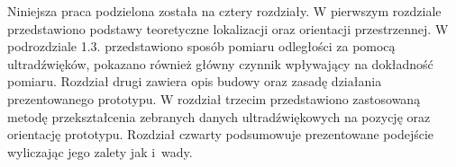 Niniejsza praca podzielona została na cztery rozdziały. W pierwszym rozdziale przedstawiono podstawy teoretyczne lokalizacji oraz orientacji 
przestrzennej. W podrozdziale 1.3. przedstawiono sposób pomiaru odległości za pomocą ultradźwięków, pokazano 
również główny czynnik wpływający na dokładność pomiaru.
Rozdział drugi zawiera opis budowy oraz zasadę działania prezentowanego prototypu. W rozdział trzecim
przedstawiono zastosowaną metodę przekształcenia zebranych danych ultradźwiękowych na pozycję oraz orientację prototypu.
Rozdział czwarty podsumowuje prezentowane podejście wyliczając jego zalety jak i~wady.

